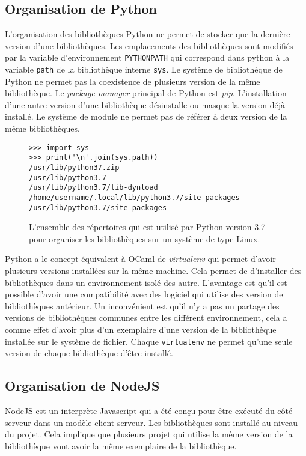 \subsection{Organisation de Python}
L'organisation des bibliothèques Python ne permet de stocker que la dernière version
d'une bibliothèques. Les emplacements des bibliothèques sont modifiés par la variable d'environnement
\verb|PYTHONPATH| qui correspond dans python à la variable \verb|path| de la bibliothèque
interne \verb|sys|. Le système de bibliothèque de Python ne permet pas la coexistence de plusieurs
version de la même bibliothèque. Le \textit{package manager} principal de Python est \textit{pip}.
L'installation d'une autre version d'une bibliothèque désinstalle
ou masque la version déjà installé. Le système de module ne permet pas de référer à deux version
de la même bibliothèques.

\begin{figure}[ht]
    \begin{minipage}[t]{0.5\textwidth}
\begin{verbatim}
>>> import sys
>>> print('\n'.join(sys.path))
/usr/lib/python37.zip
/usr/lib/python3.7
/usr/lib/python3.7/lib-dynload
/home/username/.local/lib/python3.7/site-packages
/usr/lib/python3.7/site-packages
\end{verbatim}
    \end{minipage}
    \caption{L'ensemble des répertoires qui est utilisé par Python version 3.7
    pour organiser les bibliothèques sur un système de type Linux.}
\end{figure}

Python a le concept équivalent à OCaml de \textit{virtualenv} qui permet d'avoir plusieurs
versions installées sur la même machine. Cela permet de d'installer des
bibliothèques dans un environnement isolé des autre. L'avantage est qu'il est
possible d'avoir une compatibilité avec des logiciel qui utilise des version de
bibliothèques antérieur. Un inconvénient est qu'il n'y a pas un partage des
versions de bibliothèques communes entre les différent environnement, cela a
comme effet d'avoir plus d'un exemplaire d'une version de la bibliothèque installée
sur le système de fichier. Chaque \texttt{virtualenv} ne permet qu'une seule version de
chaque bibliothèque d'être installé.


\subsection{Organisation de NodeJS}
NodeJS est un interprète Javascript qui a été conçu pour être exécuté
du côté serveur dans un modèle client-serveur. Les bibliothèques sont
installé au niveau du projet. Cela implique que plusieurs projet qui
utilise la même version de la bibliothèque vont avoir la même exemplaire
de la bibliothèque.

